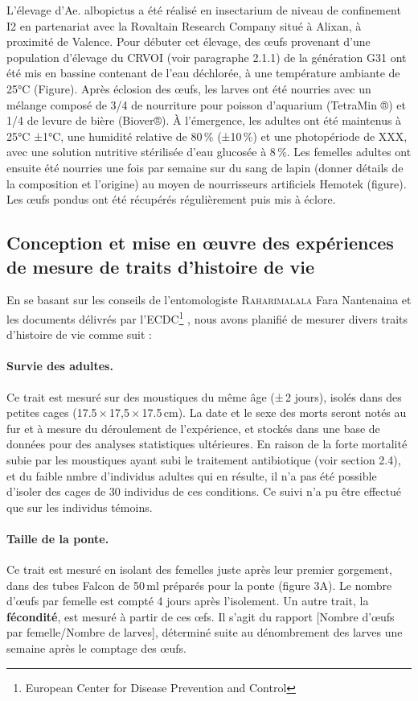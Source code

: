 L’élevage d'Ae. albopictus a été réalisé en insectarium de niveau de confinement I2 en partenariat avec la Rovaltain Research Company situé à Alixan, à proximité de Valence. Pour débuter cet élevage, des œufs provenant d’une population d’élevage du CRVOI (voir paragraphe 2.1.1) de la génération G31 ont été mis en bassine contenant de l'eau déchlorée, à une température ambiante de 25°C (Figure). 
Après éclosion des œufs, les larves ont été nourries avec un mélange composé de 3/4 de nourriture pour poisson d'aquarium (TetraMin ®) et 1/4 de levure de bière (Biover®).
À l'émergence, les adultes ont été maintenus à 25°C ±1°C, une humidité relative de 80\,\% (±10\,\%) et une photopériode de XXX, avec une solution nutritive stérilisée d'eau glucosée à 8\,\%. Les femelles adultes ont ensuite été nourries une fois par semaine sur du sang de lapin (donner détails de la composition et l’origine) au moyen de nourrisseurs artificiels Hemotek (figure).
Les œufs pondus ont été récupérés régulièrement puis mis à éclore.

\subsection{Conception et mise en \oe{}uvre des expériences de mesure de traits d'histoire de vie}

En se basant sur les conseils de l'entomologiste \textsc{Raharimalala} Fara Nantenaina et les documents délivrés par l'ECDC\footnote{European Center for Disease Prevention and Control} \cite{ecdc}, nous avons planifié de mesurer divers traits d'histoire de vie comme suit :

\paragraph{Survie des adultes.} Ce trait est mesuré sur des moustiques du même âge (±\,2 jours), isolés dans des petites cages (17.5\,×\,17,5\,×\,17.5\,cm). La date et le sexe des morts seront notés au fur et à mesure du déroulement de l'expérience, et stockés dans une base de données pour des analyses statistiques ultérieures.
En raison de la forte mortalité subie par les moustiques ayant subi le traitement antibiotique (voir section 2.4), et du faible nmbre d'individus adultes qui en résulte, il n'a pas été possible d'isoler des cages de 30 individus de ces conditions.
Ce suivi n'a pu être effectué que sur les individus témoins.

\paragraph{Taille de la ponte.} Ce trait est mesuré en isolant des femelles juste après leur premier gorgement, dans des tubes Falcon de 50\,ml préparés pour la ponte (figure 3A). Le nombre d'\oe{}ufs par femelle est compté 4 jours après l'isolement.
Un autre trait, la \textbf{fécondité}, est mesuré à partir de ces \oe{}fs. Il s'agit du rapport [Nombre d'\oe{}ufs par femelle/Nombre de larves], déterminé suite au dénombrement des larves une semaine après le comptage des \oe{}ufs.

